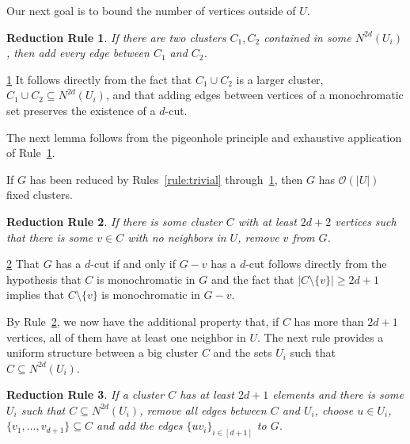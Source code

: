 \documentclass[a4paper,UKenglish,cleveref, autoref]{lipics-v2019}
\newtheorem{rrule}{Reduction Rule}
\newcommand{\bigO}[1]{\mathcal{O}\!\left(#1\right)}
\begin{document}
Our next goal is to bound the number of vertices outside of $U$.

\begin{rrule}
    \label{rule:fusion}
    If there are two clusters $C_1, C_2$ contained in some $N^{2d}(U_i)$, then add every edge between $C_1$ and $C_2$.
\end{rrule}

\begin{sproof}{\ref{rule:fusion}}
    It follows directly from the fact that $C_1 \cup C_2$ is a larger cluster, $C_1 \cup C_2 \subseteq N^{2d}(U_i)$, and that adding edges between vertices of a monochromatic set preserves the existence of a $d$-cut.
\end{sproof}

The next lemma follows from the pigeonhole principle and exhaustive application of Rule~\ref{rule:fusion}.

\begin{lemma}
    \label{lem:fixed_clusters}
    If $G$ has been reduced by Rules~\ref{rule:trivial} through~\ref{rule:fusion}, then $G$ has $\bigO{|U|}$ fixed clusters.
\end{lemma}

\begin{rrule}
    \label{rule:shrink}
    If there is some cluster $C$ with at least $2d+2$ vertices such that there is some $v \in C$ with no neighbors in $U$, remove $v$ from $G$.
\end{rrule}

\begin{sproof}{\ref{rule:shrink}}
    That $G$ has a $d$-cut if and only if $G - v$ has a $d$-cut follows directly from the hypothesis that $C$ is monochromatic in $G$ and the fact that $|C \setminus \{v\}| \geq 2d + 1$ implies that $C \setminus \{v\}$ is monochromatic in $G - v$.
\end{sproof}

By Rule~\ref{rule:shrink}, we now have the additional property that, if $C$ has more than $2d+1$ vertices, all of them have at least one neighbor in $U$. The next rule provides a uniform structure between a big cluster $C$ and the sets $U_i$ such that $C \subseteq N^{2d}(U_i)$.

\begin{rrule}
    \label{rule:normalization1}
    If a cluster $C$ has at least $2d+1$ elements and there is some $U_i$ such that $C \subseteq N^{2d}(U_i)$, remove all edges between $C$ and $U_i$, choose $u \in U_i$, $\{v_1, \dots, v_{d+1}\} \subseteq C$ and add the edges $\{uv_i\}_{i \in [d+1]}$ to $G$.
\end{rrule}
\end{document}
